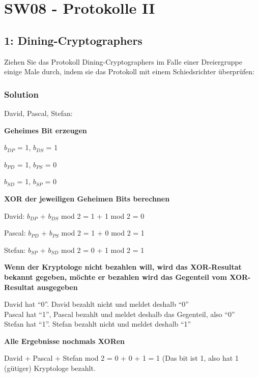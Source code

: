 \documentclass[11pt]{article}
\begin{document}
    \hypertarget{sw08---protokolle-ii}{%
\section{SW08 - Protokolle II}\label{sw08---protokolle-ii}}

    \hypertarget{aufgabe-1-dining-cryptographers}{%
\subsection{1:
Dining-Cryptographers}\label{aufgabe-1-dining-cryptographers}}

Ziehen Sie das Protokoll Dining-Cryptographers im Falle einer
Dreiergruppe einige Male durch, indem sie das Protokoll mit einem
Schiedsrichter überprüfen:

\hypertarget{solution}{%
\subsubsection{Solution}\label{solution}}

David, Pascal, Stefan:

\textbf{Geheimes Bit erzeugen}

\(b_{DP}\) = 1, \(b_{DS}\) = 1

\(b_{PD}\) = 1, \(b_{PS}\) = 0

\(b_{SD}\) = 1, \(b_{SP}\) = 0

\textbf{XOR der jeweiligen Geheimen Bits berechnen}

David: \(b_{DP}\) + \(b_{DS}\) mod 2 = 1 + 1 mod 2 = 0

Pascal: \(b_{PD}\) + \(b_{PS}\) mod 2 = 1 + 0 mod 2 = 1

Stefan: \(b_{SP}\) + \(b_{SD}\) mod 2 = 0 + 1 mod 2 = 1

\textbf{Wenn der Kryptologe nicht bezahlen will, wird das XOR-Resultat
bekannt gegeben, möchte er bezahlen wird das Gegenteil vom XOR-Resultat
ausgegeben}

David hat ``0''. David bezahlt nicht und meldet deshalb ``0''\\
Pascal hat ``1'', Pascal bezahlt und meldet deshalb das Gegenteil, also
``0''\\
Stefan hat ``1''. Stefan bezahlt nicht und meldet deshalb ``1''

\textbf{Alle Ergebnisse nochmals XORen}

David + Pascal + Stefan mod 2 = 0 + 0 + 1 = 1 (Das bit ist 1, also hat 1
(gütiger) Kryptologe bezahlt.

\newpage
\end{document}
